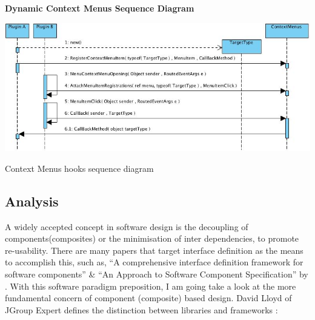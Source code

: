 		\vspace{3mm}
		\large{\bfseries{Dynamic Context Menus Sequence Diagram}}
		\newline
		
		\begin{figurehere}
			\includegraphics[scale=0.6]{pages/chapter3/figures/SequenceContextMenus2.jpg}
			\caption{Context Menus hooks sequence diagram}
		\end{figurehere}
						

\newpage
						

	\subsection{Analysis}
	
		\normalsize
		{	
			A widely accepted concept in software design is the decoupling of components(composites) or the minimisation of inter dependencies, to promote re-usability.  
			There are many papers that target interface definition as the means to accomplish this, such as, 
			``A comprehensive interface definition framework for software components'' \& ``An Approach to Software Component Specification'' by \citet{JunHan}.
			With this software paradigm preposition, I am going take a look at the more fundamental concern of component (composite) based design. 
			\newline
			\newline
			David Lloyd of JGroup Expert defines the distinction between libraries and frameworks :
		}	
			
